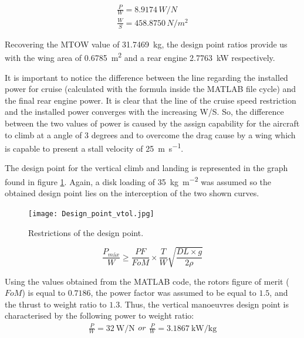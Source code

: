 \documentclass[english,fira]{ist-report}
\begin{document}
\begin{gather*}
    \frac{P}{W} = 8.9174\,W/N \\
    \frac{W}{S} = 458.8750\,N/m^2
\end{gather*}

Recovering the MTOW value of \SI{31.7469}{\kilogram}, the design point ratios provide us with the wing area of \SI{0.6785}{\meter\squared} and a rear engine \SI{2.7763}{\kilo\watt} respectively. 

It is important to notice the difference between the line regarding the installed power for cruise (calculated with the formula inside the MATLAB file cycle) and the final rear engine power. It is clear that the line of the cruise speed restriction and the installed power converges with the increasing W/S. So, the difference between the two values of power is caused by the assign capability for the aircraft to climb at a angle of 3 degrees and to overcome the drag cause by a wing which is capable to present a stall velocity of \SI{25}{\meter\per\second}.

The design point for the vertical climb and landing is represented in the graph found in figure \ref{fig:design_point_restrictions}. Again, a disk loading of \SI{35}{\kilogram\per\meter\squared} was assumed so the obtained design point lies on the interception of the two shown curves. 

\begin{figure}[ht]
	\centering
	\texttt{[image: Design\_point\_vtol.jpg]}
	\caption{Restrictions of the design point.}
	\label{fig:design_point_restrictions}
\end{figure}

\begin{equation}
    \frac{P_{máx}}{W} \ge \frac{PF}{FoM}\times \frac{T}{W} \sqrt{\frac{DL\times g}{2\rho}}
\end{equation}

Using the values obtained from the MATLAB code, the rotors figure of merit ($FoM$) is equal to $0.7186$, the power factor was assumed to be equal to $1.5$, and the thrust to weight ratio to $1.3$. Thus, the vertical manoeuvres design point is characterised by the following power to weight ratio:
\begin{subequations}
    \begin{gather}
        \frac{P}{W} = \SI{32}{\watt\per\newton}
    \end{gather}
    or
    \begin{gather}
        \frac{P}{W} = \SI{3.1867}{\kilo\watt\per\kilogram}
    \end{gather}
\end{subequations}
\end{document}
